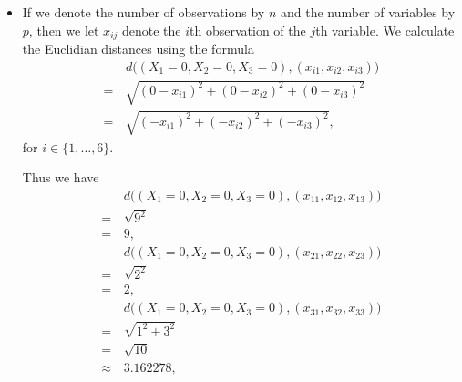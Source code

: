 \begin{itemize}
    \item[(a)] If we denote the number of observations by $n$ and the number of
        variables by $p$, then we let $x_{ij}$ denote the $i$th observation of the
        $j$th variable. We calculate the Euclidian distances using the formula
        \begin{equation*}
            \begin{split}
                &d\bigl((X_1 = 0, X_2 = 0, X_3 = 0), (x_{i1}, x_{i2}, x_{i3})\bigr) \\
                = \, &\sqrt{{(0 - x_{i1})}^2 + {(0 - x_{i2})}^2 + {(0 - x_{i3})}^2} \\
                = \, &\sqrt{{(-x_{i1})}^2 + {(-x_{i2})}^2 + {(-x_{i3})}^2},
            \end{split}
        \end{equation*}
        for $i \in \lbrace 1, \dotsc, 6\rbrace$.\par
        Thus we have
        \begin{equation*}
            \begin{split}
                &d\bigl((X_1 = 0, X_2 = 0, X_3 = 0), (x_{11}, x_{12}, x_{13})\bigr) \\
                = \, &\sqrt{9^2} \\
                = \, &9,
            \end{split}
        \end{equation*}
        \begin{equation*}
            \begin{split}
                &d\bigl((X_1 = 0, X_2 = 0, X_3 = 0), (x_{21}, x_{22}, x_{23})\bigr) \\
                = \, &\sqrt{2^2} \\
                = \, &2,
            \end{split}
        \end{equation*}
        \begin{equation*}
            \begin{split}
                &d\bigl((X_1 = 0, X_2 = 0, X_3 = 0), (x_{31}, x_{32}, x_{33})\bigr) \\
                = \, &\sqrt{1^2 + 3^2} \\
                = \, &\sqrt{10} \\
                \approx \, &3.162278,
            \end{split}
        \end{equation*}

\end{itemize}
